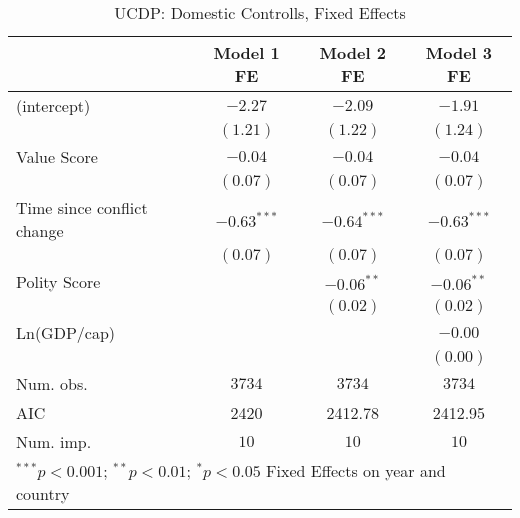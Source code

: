 
\begin{table}
\begin{center}
\begin{tabular}{l c c c}
\toprule
 & Model 1 FE & Model 2 FE & Model 3 FE \\
\midrule
(intercept)                & $-2.27$       & $-2.09$       & $-1.91$       \\
                           & $(1.21)$      & $(1.22)$      & $(1.24)$      \\
Value Score                & $-0.04$       & $-0.04$       & $-0.04$       \\
                           & $(0.07)$      & $(0.07)$      & $(0.07)$      \\
Time since conflict change & $-0.63^{***}$ & $-0.64^{***}$ & $-0.63^{***}$ \\
                           & $(0.07)$      & $(0.07)$      & $(0.07)$      \\
Polity Score               &               & $-0.06^{**}$  & $-0.06^{**}$  \\
                           &               & $(0.02)$      & $(0.02)$      \\
Ln(GDP/cap)                &               &               & $-0.00$       \\
                           &               &               & $(0.00)$      \\
\midrule
Num. obs.                  & $3734$        & $3734$        & $3734$        \\
AIC                        & 2420          & 2412.78       & 2412.95       \\
Num. imp.                  & $10$          & $10$          & $10$          \\
\bottomrule
\multicolumn{4}{l}{\scriptsize{ $^{***}p<0.001$; $^{**}p<0.01$; $^{*}p<0.05$ 
 Fixed Effects on year and country}}
\end{tabular}
\caption{UCDP: Domestic Controlls, Fixed Effects}
\label{UCDP_1_FE}
\end{center}
\end{table}

